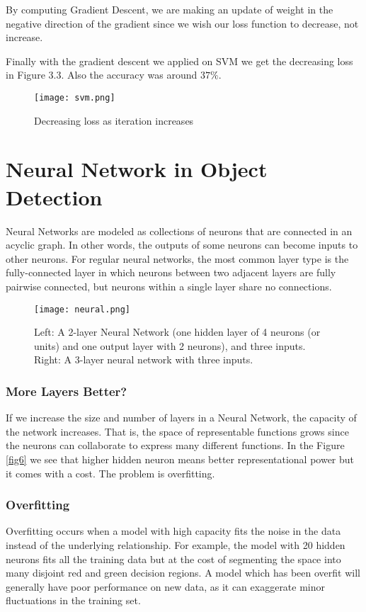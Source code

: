 By computing Gradient Descent, we are making an update of weight in the negative direction of the gradient since we wish our loss function to decrease, not increase.\hfill \break

Finally with the gradient descent we applied on SVM we get the decreasing loss in Figure 3.3. Also the accuracy was around $37\%$.
\begin{figure}[h!]
  \centering
  \texttt{[image: svm.png]}
  \caption{Decreasing loss as iteration increases}
  \label{fig4}
\end{figure}

\section{Neural Network in Object Detection}
Neural Networks are modeled as collections of neurons that are connected in an acyclic graph. In other words, the outputs of some neurons can become inputs to other neurons. For regular neural networks, the most common layer type is the fully-connected layer in which neurons between two adjacent layers are fully pairwise connected, but neurons within a single layer share no connections. 
\begin{figure}[h!]
  \centering
  \texttt{[image: neural.png]}
  \caption{Left: A 2-layer Neural Network (one hidden layer of 4 neurons (or units) and one output layer with 2 neurons), and three inputs. Right: A 3-layer neural network with three inputs.}
  \label{fig5}
\end{figure}
\subsubsection{More Layers Better?}

If we increase the size and number of layers in a Neural Network, the capacity of the network increases. That is, the space of representable functions grows since the neurons can collaborate to express many different functions. In the Figure \ref{fig6} we see that higher hidden neuron means better representational power but it comes with a cost. The problem is overfitting.

\subsubsection{Overfitting}

Overfitting occurs when a model with high capacity fits the noise in the data instead of the underlying relationship. For example, the model with 20 hidden neurons fits all the training data but at the cost of segmenting the space into many disjoint red and green decision regions. A model which has been overfit will generally have poor performance on new data, as it can exaggerate minor fluctuations in the training set.

